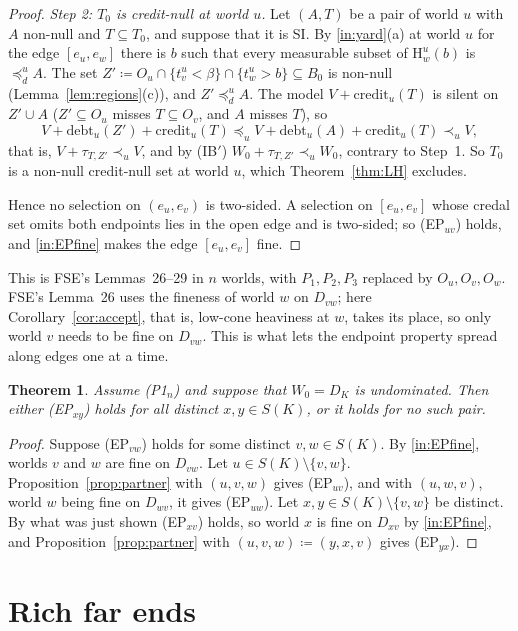 \documentclass[11pt]{article}
\newtheorem{theorem}{Theorem}
\theoremstyle{definition}\newtheorem{definition}[theorem]{Definition}
\theoremstyle{remark}\newtheorem{remark}[theorem]{Remark}
\newcommand{\debt}{\mathrm{debt}}
\newcommand{\cred}{\mathrm{credit}}
\newcommand{\Hi}[3]{\mathrm H^{#1}_{#2}(#3)}
\begin{document}
\begin{proof}
\emph{Step 2: $T_0$ is credit-null at world $u$.} Let $(A,T)$ be a pair of
world $u$ with $A$ non-null and $T\subseteq T_0$, and suppose that it is
SI. By \ref{in:yard}(a) at world $u$ for the edge $[e_u,e_w]$ there is $b$
such that every measurable subset of $\Hi uwb$ is $\preceq^u_dA$. The set
$Z'\coloneqq O_u\cap\{t^u_v<\beta\}\cap\{t^u_w>b\}\subseteq B_0$ is
non-null (Lemma~\ref{lem:regions}(c)), and $Z'\preceq^u_dA$. The model $V+\cred_u(T)$ is silent on
$Z'\cup A$ ($Z'\subseteq O_u$ misses $T\subseteq O_v$, and $A$ misses $T$),
so
\[
 V+\debt_u(Z')+\cred_u(T)\preceq_uV+\debt_u(A)+\cred_u(T)\prec_uV,
\]
that is, $V+\tau_{T,Z'}\prec_uV$, and by (IB$'$)
$W_0+\tau_{T,Z'}\prec_uW_0$, contrary to Step~1. So $T_0$ is a non-null
credit-null set at world $u$, which Theorem~\ref{thm:LH} excludes.

Hence no selection on $(e_u,e_v)$ is two-sided. A selection on
$[e_u,e_v]$ whose credal set omits both endpoints lies in the open edge
and is two-sided; so (EP$_{uv}$) holds, and \ref{in:EPfine} makes the edge
$[e_u,e_v]$ fine.
\end{proof}

This is FSE's Lemmas~26--29 in $n$ worlds, with $P_1,P_2,P_3$ replaced by
$O_u,O_v,O_w$. FSE's Lemma~26 uses the fineness of world $w$ on $D_{vw}$;
here Corollary~\ref{cor:accept}, that is, low-cone heaviness at $w$, takes
its place, so only world $v$ needs to be fine on $D_{vw}$. This is what
lets the endpoint property spread along edges one at a time.

\begin{theorem}\label{thm:dichotomy}
Assume (P1$_n$) and suppose that $W_0=D_K$ is undominated. Then either
(EP$_{xy}$) holds for all distinct $x,y\in S(K)$, or it holds for no such
pair.
\end{theorem}
\begin{proof}
Suppose (EP$_{vw}$) holds for some distinct $v,w\in S(K)$. By
\ref{in:EPfine}, worlds $v$ and $w$ are fine on $D_{vw}$. Let $u\in
S(K)\setminus\{v,w\}$. Proposition~\ref{prop:partner} with $(u,v,w)$ gives
(EP$_{uv}$), and with $(u,w,v)$, world $w$ being fine on $D_{wv}$, it gives
(EP$_{uw}$). Let $x,y\in S(K)\setminus\{v,w\}$ be distinct. By what was just
shown (EP$_{xv}$) holds, so world $x$ is fine on $D_{xv}$ by
\ref{in:EPfine}, and Proposition~\ref{prop:partner} with $(u,v,w)\coloneqq
(y,x,v)$ gives (EP$_{yx}$).
\end{proof}

\section{Rich far ends}\label{sec:rich}
\end{document}
